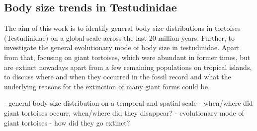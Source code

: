  

\subsection{Body size trends in Testudinidae}

The aim of this work is to identify general body size distributions in tortoises (Testudinidae) on a global scale across the last 20 million years. Further, to investigate the general evolutionary mode of body size in testudinidae. 
Apart from that, focusing on giant tortoises, which were abundant in former times, but are extinct nowadays apart from a few remaining populations on tropical islands, to discuss where and when they occurred in the fossil record and what the underlying reasons for the extinction of many giant forms could be.

- general body size distribution on a temporal and spatial scale
- when/where did giant tortoises occurr, when/where did they disappear?
- evolutionary mode of giant tortoises
- how did they go extinct?


